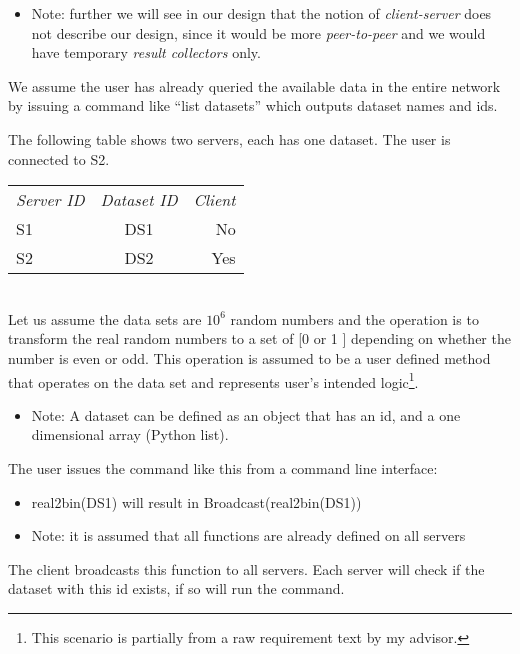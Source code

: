 \begin{itemize}
\item Note: further we will see in our design that the notion of \textit{client-server} does not describe
our design, since it would be more \textit{peer-to-peer} and we would have temporary \textit{result collectors} only.
\end{itemize}

We assume the user has already queried the available data in the entire network by 
issuing a command like “list datasets” which outputs dataset names and ids.

The following table shows two servers, each has one dataset. The user is connected to S2.\\

\begin{tabular}{ l c r }
\em{Server ID} & \em{ Dataset ID} & \em{ Client} \\
S1 & DS1 & No \\
S2 & DS2 & Yes \\
\end{tabular}\\

Let us assume the data sets are \(10^6\) random numbers and
the operation is to transform the real random numbers to a set of [0 or 1 ] depending on whether the number is even or odd. 
This operation is assumed to be a user defined method that operates on the data set and represents user's intended 
logic\footnote{This scenario is partially from a raw requirement text by my advisor.}.

\begin{itemize}
\item Note: A dataset can be defined as an object that has an id, and a one dimensional array (Python list).
\end{itemize}

The user issues the command like this from a command line interface: 

\begin{itemize}
\item real2bin(DS1) will result in  Broadcast(real2bin(DS1))
\item Note: it is assumed that all functions are already defined on all servers%
\end{itemize}

The client broadcasts this function to all servers. 
Each server will check if the dataset with this id exists, if so will run the command. 

